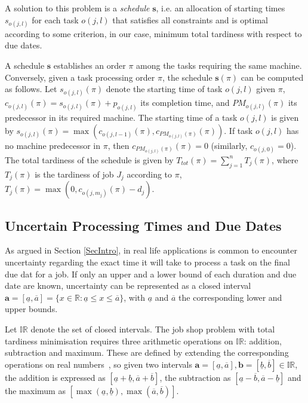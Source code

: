 \documentclass[12pt,halfline,a4paper]{ouparticle}
\begin{document}
A solution to this problem is a \emph{schedule} $\boldsymbol{s}$, i.e. an allocation of starting times $s_{o(j,l)}$ for each task $o(j,l)$ that satisfies all constraints and is optimal according to some criterion, in our case, minimum total tardiness with respect to due dates.

A schedule $\boldsymbol{s}$ establishes an order $\pi$ among the tasks requiring the same machine. Conversely, given a task processing order $\pi$, the schedule $\boldsymbol{s}(\pi)$ can be computed as follows. Let $s_{o(j,l)}(\pi)$ denote the starting time of task $o(j,l)$ given $\pi$, $c_{o(j,l)}(\pi)=s_{o(j,l)}(\pi)+p_{o(j,l)}$ its completion time, and $PM_{o(j,l)}(\pi)$ its predecessor in its required machine. The starting time of a task $o(j,l)$ is given by $s_{o(j,l)}(\pi) = \max(c_{o(j,l-1)}(\pi),c_{PM_{o(j,l)}(\pi)}(\pi))$. If task $o(j,l)$ has no machine predecessor in $\pi$, then $c_{PM_{o(j,l)}(\pi)}(\pi)=0$ (similarly, $c_{o(j,0)}=0$). The total tardiness of the schedule is given by $T_{tot}(\pi)=\sum_{j=1}^n T_j(\pi)$, where $T_j(\pi)$ is the tardiness of job $J_j$ according to $\pi$, $T_j(\pi)=\max(0, c_{o(j,m_j)}(\pi)-d_j)$.


\subsection{Uncertain Processing Times and Due Dates} \label{subsecIntervalDurations}
As argued in Section \ref{SecIntro}, in real life applications is common to encounter uncertainty regarding the exact time it will take to process a task on the final due dat for a job.  If only an upper and a lower bound of each duration and due date are known, uncertainty can be represented as a closed interval  $\mathbf{a}=[\underline{a},\overline{a}]=\{x \in \mathbb{R}: \underline{a} \leq x \leq \overline{a}\}$, with $\underline{a}$ and $\overline{a}$ the corresponding lower and upper bounds.

Let $\mathbb{IR}$ denote the set of closed intervals. The job shop problem with total tardiness minimisation requires three arithmetic operations on $\mathbb{IR}$: addition, subtraction and maximum. These are defined by extending the corresponding operations on real numbers~\cite{Moore2009}, so given two intervals $\mathbf{a}=[\underline{a},\overline{a}], \mathbf{b}=[\underline{b},\overline{b}] \in \mathbb{IR}$, the addition is expressed as $[\underline{a}+\underline{b}, \overline{a}+\overline{b}]$, the subtraction as $[\underline{a}-\overline{b}, \overline{a}-\underline{b}]$ and the maximum as $[\max(\underline{a}, \underline{b}), \max(\overline{a}, \overline{b})]$.
\end{document}
